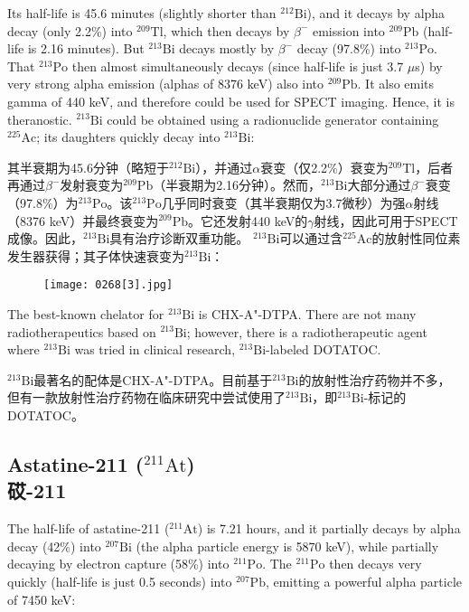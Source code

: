 \documentclass[dvipsnames, svgnames,a4paper,11pt]{article}
\begin{document}
Its half-life is 45.6 minutes (slightly shorter than \(\mathrm{^{212}Bi}\)), and it decays by alpha decay (only 2.2\%) into \(\mathrm{^{209}Tl}\), which then decays by \(\beta^{-}\) emission into \(\mathrm{^{209}Pb}\) (half-life is 2.16 minutes). But \(\mathrm{^{213}Bi}\) decays mostly by \(\beta^{-}\) decay (97.8\%) into \(\mathrm{^{213}Po}\). That \(\mathrm{^{213}Po}\) then almost simultaneously decays (since half-life is just 3.7 $\mu$s) by very strong alpha emission (alphas of 8376 keV) also into \(\mathrm{^{209}Pb}\). It also emits gamma of 440 keV, and therefore could be used for SPECT imaging. Hence, it is theranostic. \(\mathrm{^{213}Bi}\) could be obtained using a radionuclide generator containing \(\mathrm{^{225}Ac}\); its daughters quickly decay into \(\mathrm{^{213}Bi}\):

其半衰期为45.6分钟（略短于\(\mathrm{^{212}Bi}\)），并通过$\alpha$衰变（仅2.2\%）衰变为\(\mathrm{^{209}Tl}\)，后者再通过\(\beta^{-}\)发射衰变为\(\mathrm{^{209}Pb}\)（半衰期为2.16分钟）。然而，\(\mathrm{^{213}Bi}\)大部分通过\(\beta^{-}\)衰变（97.8\%）为\(\mathrm{^{213}Po}\)。该\(\mathrm{^{213}Po}\)几乎同时衰变（其半衰期仅为3.7微秒）为强$\alpha$射线（8376 keV）并最终衰变为\(\mathrm{^{209}Pb}\)。它还发射440 keV的$\gamma$射线，因此可用于SPECT成像。因此，\(\mathrm{^{213}Bi}\)具有治疗诊断双重功能。 \(\mathrm{^{213}Bi}\)可以通过含\(\mathrm{^{225}Ac}\)的放射性同位素发生器获得；其子体快速衰变为\(\mathrm{^{213}Bi}\)：

\begin{figure}[h]
	\centering
    \texttt{[image: 0268[3].jpg]}  
     \label{fig360}
\end{figure}

The best-known chelator for \(\mathrm{^{213}Bi}\) is CHX-A"-DTPA. There are not many radiotherapeutics based on \(\mathrm{^{213}Bi}\); however, there is a radiotherapeutic agent where \(\mathrm{^{213}Bi}\) was tried in clinical research, \(\mathrm{^{213}Bi}\)-labeled DOTATOC.

\(\mathrm{^{213}Bi}\)最著名的配体是CHX-A"-DTPA。目前基于\(\mathrm{^{213}Bi}\)的放射性治疗药物并不多，但有一款放射性治疗药物在临床研究中尝试使用了\(\mathrm{^{213}Bi}\)，即\(\mathrm{^{213}Bi}\)-标记的DOTATOC。

\subsection{Astatine-211 (\(\mathrm{^{211}At}\)) \\砹-211}  
The half-life of astatine-211 (\(\mathrm{^{211}At}\)) is 7.21 hours, and it partially decays by alpha decay (42\%) into \(\mathrm{^{207}Bi}\) (the alpha particle energy is 5870 keV), while partially decaying by electron capture (58\%) into \(\mathrm{^{211}Po}\). The \(\mathrm{^{211}Po}\) then decays very quickly (half-life is just 0.5 seconds) into \(\mathrm{^{207}Pb}\), emitting a powerful alpha particle of 7450 keV:
\end{document}
